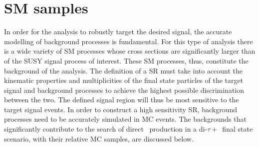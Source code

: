 	\section{SM samples}
	\label{sec:smsamples}
	In order for the analysis to robustly target the desired signal, the accurate modelling of background processes is fundamental. For this type of analysis there is a wide variety of \ac{SM} processes whose cross sections are significantly larger than of the \ac{SUSY} signal process of interest. These \ac{SM} processes, thus, constitute the background of the analysis.  
	The definition of a \ac{SR} must take into account the kinematic properties and multiplicities of the final state particles of the target signal and background processes to achieve the highest possible discrimination between the two. The defined signal region will thus be most sensitive to the target signal events.
	In order to construct a high sensitivity \ac{SR}, background processes need to be accurately simulated in \ac{MC} events.  
	The backgrounds that significantly contribute to the search of direct \stau\ production in a di-$\tau+$\met\ final state scenario, with their relative \ac{MC} samples, are discussed below. 
